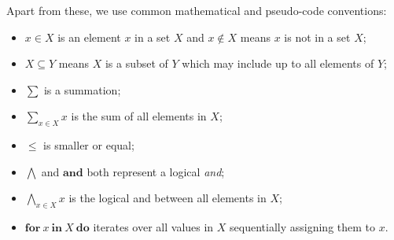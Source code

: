 \documentclass[9pt, oneside]{article}   	%
\begin{document}
Apart from these, we use common mathematical and pseudo-code conventions: 
\begin{itemize}
	\item $x \in X$ is an element $x$ in a set $X$ and $x \notin X$ means $x$ is not in a set $X$;
	\item $X \subseteq Y$ means $X$ is a subset of $Y$ which may include up to all elements of $Y$;
	 \item $\sum$ is a summation;
	 \item $\sum\limits_{x \in X} x$ is the sum of all elements in $X$;
	 \item $\leq$ is smaller or equal;
	 \item $\bigwedge$ and $\textbf{and}$ both represent a logical \textit{and};
	 \item $\bigwedge\limits_{x \in X} x$ is the logical and between all elements in $X$;
	 \item $\textbf{for}~x ~\textbf{in}~ X~\textbf{do}$ iterates over all values in $X$ sequentially assigning them to $x$.
\end{itemize}
\end{document}
